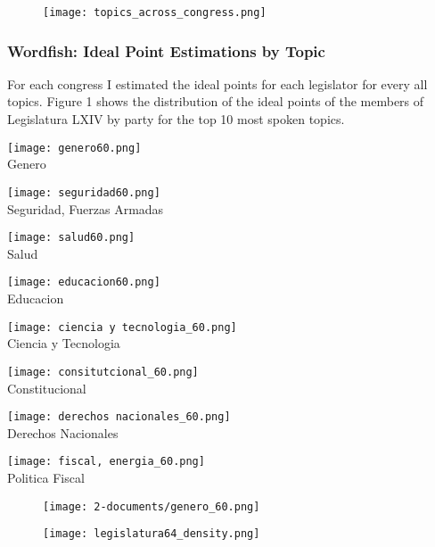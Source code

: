 \documentclass{article}
\begin{document}
\begin{figure}
	\texttt{[image: topics\_across\_congress.png]} \\
\end{figure}


\newpage
\subsubsection{Wordfish: Ideal Point Estimations by Topic}

For each congress I estimated the ideal points for each legislator for every all topics. Figure 1 shows the distribution of the ideal points of the members of Legislatura LXIV by party for the top 10 most spoken topics. 

\begin{minipage}{0.25\textwidth}\raggedleft
	\texttt{[image: genero60.png]} \\
	\centering \scriptsize{Genero}
\end{minipage}
\begin{minipage}{0.25\textwidth}\raggedleft
	\texttt{[image: seguridad60.png]} \\
	\centering \scriptsize{Seguridad, Fuerzas Armadas }
\end{minipage}
\begin{minipage}{0.25\textwidth}\raggedleft
	\texttt{[image: salud60.png]} \\
	\centering \scriptsize{Salud}
\end{minipage}
\begin{minipage}{0.25\textwidth}\raggedleft
	\texttt{[image: educacion60.png]} \\
	\centering \scriptsize{Educacion}
\end{minipage}
\begin{minipage}{0.25\textwidth}\raggedleft
	\texttt{[image: ciencia y tecnologia\_60.png]} \\
	\centering \scriptsize{Ciencia y Tecnologia}
\end{minipage}
\begin{minipage}{0.25\textwidth}\raggedleft
	\texttt{[image: consitutcional\_60.png]} \\
	\centering \scriptsize{Constitucional}
\end{minipage}
\begin{minipage}{0.25\textwidth}\raggedleft
	\texttt{[image: derechos nacionales\_60.png]} \\
	\centering \scriptsize{Derechos Nacionales}
\end{minipage}
\begin{minipage}{0.25\textwidth}\raggedleft
	\texttt{[image: fiscal, energia\_60.png]} \\
	\centering \scriptsize{Politica Fiscal}
\end{minipage}


\begin{figure}
	\centering
	\caption{}
	\label{} 
	\texttt{[image: 2-documents/genero\_60.png]} \\
\end{figure}

\begin{figure}
	\centering
	\caption{}
	\label{} 
	\texttt{[image: legislatura64\_density.png]} \\
\end{figure}
\end{document}
